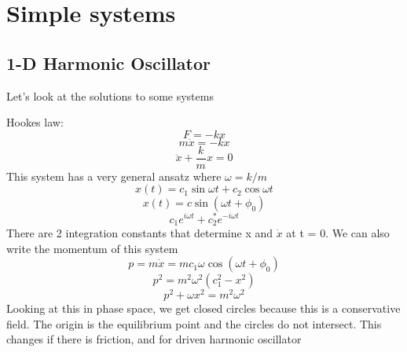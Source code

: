 \documentclass[12pt]{article} %
\begin{document}
\section{Simple systems}
\subsection{1-D Harmonic Oscillator}
Let's look at the solutions to some systems

Hookes law:
\begin{equation}
F = -kx 
\end{equation}
\begin{equation}
m\ddot{x} = -kx
\end{equation}
\begin{equation}
\ddot{x} + \frac{k}{m} x = 0
\end{equation}
This system has a very general ansatz where $\omega = k / m$
\begin{equation}
x(t) = c_1 \sin\omega t + c_2 \cos\omega t
\end{equation}
\begin{equation}
x(t) = c\sin(\omega t + \phi_0)
\end{equation}
\begin{equation}
c_1 e^{i\omega t} + c_2^* e^{-i \omega t}
\end{equation}
There are 2 integration constants that determine x and $\dot{x}$ at t = 0. We can also write the momentum of this system
\begin{equation}
p = m\dot{x} = mc_1 \omega \cos(\omega t + \phi_0)
\end{equation}
\begin{equation}
p^2 = m^2 \omega^2 (c_1^2 - x^2)
\end{equation}
\begin{equation}
p^2 + \omega x^2 = m^2 \omega^2
\end{equation}
Looking at this in phase space, we get closed circles because this is a conservative field. The origin is the equilibrium point and the circles do not intersect. This changes if there is friction, and for driven harmonic oscillator
\end{document}
